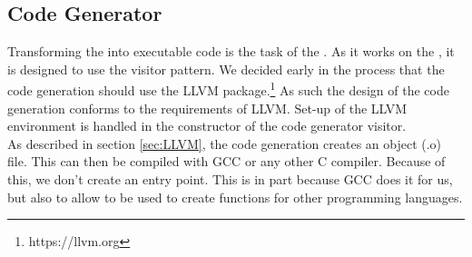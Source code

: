\subsection{Code Generator}
\label{sec:codeGeneratorDesign}
Transforming the \ast{} into executable code is the task of the \codeGen. As it works on the \ast{}, it is designed to use the visitor pattern. We decided early in the process that the code generation should use the LLVM package.\footnote{https://llvm.org} As such the design of the code generation conforms to the requirements of LLVM. Set-up of the LLVM environment is handled in the constructor of the code generator visitor.\\
As described in section \ref{sec:LLVM}, the code generation creates an object (.o)
file. This can then be compiled with GCC or any other C compiler. Because of this, we
don't create an entry point. This is in part because GCC does it for us, but also to
allow \lang{} to be used to create functions for other programming languages. 
